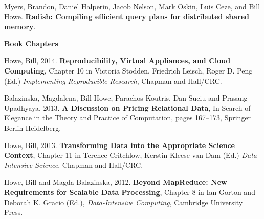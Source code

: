 \begin{bulletlist}
\item Myers, Brandon, Daniel Halperin, Jacob Nelson, Mark Oskin, Luis Ceze, and Bill Howe.
\textbf{Radish: Compiling efficient query plans for distributed shared memory}.
\end{bulletlist}

{\bf Book Chapters}

\begin{bulletlist}

\item Howe, Bill, 2014. \textbf{Reproducibility, Virtual Appliances, and Cloud Computing}, 
Chapter 10 in Victoria Stodden, Friedrich Leisch, Roger D. Peng (Ed.) 
\emph{Implementing Reproducible Research}, Chapman and Hall/CRC.

\item Balazinska, Magdalena, Bill Howe, Parachos Koutris, Dan Suciu and Prasang Upadhyaya. 2013. 
\textbf{A Discussion on Pricing Relational Data}, In Search of Elegance in the Theory and Practice of Computation, pages 167--173, Springer Berlin Heidelberg.

\item Howe, Bill, 2013. 
\textbf{Transforming Data into the Appropriate Science Context}, Chapter 11 in Terence Critchlow, Kerstin Kleese van Dam (Ed.) \emph{Data-Intensive Science}, 
Chapman and Hall/CRC.

\item Howe, Bill and Magda Balazinska, 2012. 
\textbf{Beyond MapReduce: New Requirements for Scalable Data Processing}, Chapter 8 in Ian Gorton and Deborah K. Gracio (Ed.), \emph{Data-Intensive Computing}, Cambridge University Press.

\end{bulletlist}

